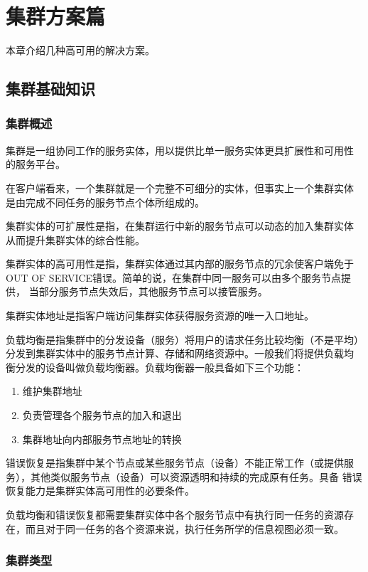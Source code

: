 \part{集群方案篇}

本章介绍几种高可用的解决方案。

\chapter{集群基础知识}

\section{集群概述}

集群是一组协同工作的服务实体，用以提供比单一服务实体更具扩展性和可用性
的服务平台。

在客户端看来，一个集群就是一个完整不可细分的实体，但事实上一个集群实体
是由完成不同任务的服务节点个体所组成的。

集群实体的可扩展性是指，在集群运行中新的服务节点可以动态的加入集群实体
从而提升集群实体的综合性能。

集群实体的高可用性是指，集群实体通过其内部的服务节点的冗余使客户端免于
OUT OF SERVICE错误。简单的说，在集群中同一服务可以由多个服务节点提供，
当部分服务节点失效后，其他服务节点可以接管服务。

集群实体地址是指客户端访问集群实体获得服务资源的唯一入口地址。

负载均衡是指集群中的分发设备（服务）将用户的请求任务比较均衡（不是平均）
分发到集群实体中的服务节点计算、存储和网络资源中。一般我们将提供负载均
衡分发的设备叫做负载均衡器。负载均衡器一般具备如下三个功能：

\begin{enumerate}[itemsep=0pt,parsep=0pt]
\item 维护集群地址
\item 负责管理各个服务节点的加入和退出
\item 集群地址向内部服务节点地址的转换
\end{enumerate}

错误恢复是指集群中某个节点或某些服务节点（设备）不能正常工作（或提供服
  务），其他类似服务节点（设备）可以资源透明和持续的完成原有任务。具备
错误恢复能力是集群实体高可用性的必要条件。

负载均衡和错误恢复都需要集群实体中各个服务节点中有执行同一任务的资源存
在，而且对于同一任务的各个资源来说，执行任务所学的信息视图必须一致。

\section{集群类型}

